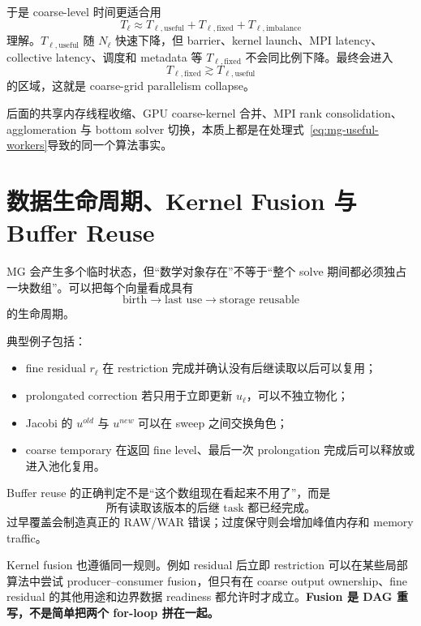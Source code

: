 于是 coarse-level 时间更适合用
\begin{equation}
T_\ell
\approx
T_{\ell,\mathrm{useful}}
+
T_{\ell,\mathrm{fixed}}
+
T_{\ell,\mathrm{imbalance}}
\end{equation}
理解。$T_{\ell,\mathrm{useful}}$ 随 $N_\ell$ 快速下降，但 barrier、kernel launch、MPI latency、collective latency、调度和 metadata 等 $T_{\ell,\mathrm{fixed}}$ 不会同比例下降。最终会进入
\begin{equation}
\boxed{
T_{\ell,\mathrm{fixed}}
\gtrsim
T_{\ell,\mathrm{useful}}
}
\end{equation}
的区域，这就是 coarse-grid parallelism collapse。

后面的共享内存线程收缩、GPU coarse-kernel 合并、MPI rank consolidation、agglomeration 与 bottom solver 切换，本质上都是在处理式~\eqref{eq:mg-useful-workers}导致的同一个算法事实。

\section{数据生命周期、Kernel Fusion 与 Buffer Reuse}

MG 会产生多个临时状态，但“数学对象存在”不等于“整个 solve 期间都必须独占一块数组”。可以把每个向量看成具有
\begin{equation}
\text{birth}
\rightarrow
\text{last use}
\rightarrow
\text{storage reusable}
\end{equation}
的生命周期。

典型例子包括：
\begin{itemize}
\item fine residual $r_\ell$ 在 restriction 完成并确认没有后继读取以后可以复用；
\item prolongated correction 若只用于立即更新 $u_\ell$，可以不独立物化；
\item Jacobi 的 $u^{old}$ 与 $u^{new}$ 可以在 sweep 之间交换角色；
\item coarse temporary 在返回 fine level、最后一次 prolongation 完成后可以释放或进入池化复用。
\end{itemize}

Buffer reuse 的正确判定不是“这个数组现在看起来不用了”，而是
\begin{equation}
\boxed{
\text{所有读取该版本的后继 task 都已经完成。}
}
\end{equation}
过早覆盖会制造真正的 RAW/WAR 错误；过度保守则会增加峰值内存和 memory traffic。

Kernel fusion 也遵循同一规则。例如 residual 后立即 restriction 可以在某些局部算法中尝试 producer--consumer fusion，但只有在 coarse output ownership、fine residual 的其他用途和边界数据 readiness 都允许时才成立。\textbf{Fusion 是 DAG 重写，不是简单把两个 for-loop 拼在一起。}

